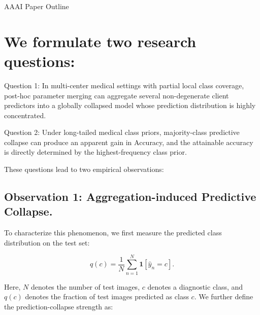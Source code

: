 \documentclass[letterpaper]{article}
\begin{document}
AAAI Paper Outline


\section{We formulate two research questions:}

Question 1: In multi-center medical settings with partial local class coverage, post-hoc parameter merging can aggregate several non-degenerate client predictors into a globally collapsed model whose prediction distribution is highly concentrated.


Question 2: Under long-tailed medical class priors, majority-class predictive collapse can produce an apparent gain in Accuracy, and the attainable accuracy is directly determined by the highest-frequency class prior.


These questions lead to two empirical observations:


\subsection{Observation 1: Aggregation-induced Predictive Collapse.}

To characterize this phenomenon, we first measure the predicted class distribution on the test set:


\begin{equation}
q(c)=\frac{1}{N}\sum_{n=1}^{N}\mathbf{1}\left[\hat{y}_n=c\right].
\end{equation}

Here, $N$ denotes the number of test images, $c$ denotes a diagnostic class, and $q(c)$ denotes the fraction of test images predicted as class $c$. We further define the prediction-collapse strength as:
\end{document}

